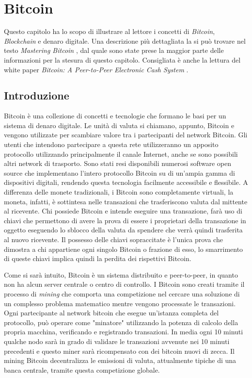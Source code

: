 
\chapter{Bitcoin}
\label{bitcoin-chapter}
Questo capitolo ha lo scopo di illustrare al lettore i concetti di \textit{Bitcoin}, \textit{Blockchain} e denaro digitale. Una descrizione più dettagliata la si può trovare nel testo \textit{Mastering Bitcoin} \cite{mastering:andreas}, dal quale sono state prese la maggior parte delle informazioni per la stesura di questo capitolo. Consigliata è anche la lettura del white paper \textit{Bitcoin: A Peer-to-Peer Electronic Cash System} \cite{paper-bitcoin:satoshi}.

\section{Introduzione}
Bitcoin è una collezione di concetti e tecnologie che formano le basi per un sistema di denaro digitale. Le unità di valuta si chiamano, appunto, Bitcoin e vengono utilizzate per scambiare valore tra i partecipanti del network Bitcoin. Gli utenti che intendono partecipare a questa rete utilizzeranno un apposito protocollo utilizzando principalmente il canale Internet, anche se sono possibili altri network di trasporto. Sono stati resi disponibili numerosi software open source che implementano l'intero protocollo Bitcoin su di un'ampia gamma di dispositivi digitali, rendendo questa tecnologia facilmente accessibile e flessibile. A differenza delle monete tradizionali, i Bitcoin sono completamente virtuali, la moneta, infatti, è sottintesa nelle transazioni che trasferiscono valuta dal mittente al ricevente. Chi possiede Bitcoin e intende eseguire una transazione, farà uso di chiavi che permettono di avere la prova di essere i proprietari della transazione in oggetto eseguendo lo sblocco della valuta da spendere che verrà quindi trasferita al nuovo ricevente. Il possesso delle chiavi sopraccitate è l'unica prova che dimostra a chi appartiene ogni singolo Bitcoin o frazione di esso, lo smarrimento di queste chiavi implica quindi la perdita dei rispettivi Bitcoin.

Come si sarà intuito, Bitcoin è un sistema distribuito e peer-to-peer, in quanto non ha alcun server centrale o centro di controllo. I Bitcoin sono creati tramite il processo di \textit{mining} che comporta una competizione nel cercare una soluzione di un complesso problema matematico mentre vengono processate le transazioni. Ogni partecipante al network bitcoin che esegue un'istanza completa del protocollo,  può operare come "minatore" utilizzando la potenza di calcolo della propria macchina, verificando e registrando transazioni. In media ogni 10 minuti qualche nodo sarà in grado di validare le transazioni avvenute nei 10 minuti precedenti e questo miner sarà ricompensato con dei bitcoin nuovi di zecca. Il mining Bitcoin decentralizza le emissioni di valuta, attualmente tipiche di una banca centrale, tramite questa competizione globale.

